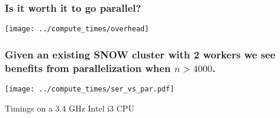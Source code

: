 \documentclass{beamer}
\begin{document}
\begin{frame}


\frametitle{Is it worth it to go parallel?}

    \centerline{\texttt{[image: ../compute\_times/overhead]}}




\end{frame}
\begin{frame}

\frametitle{Given an existing SNOW cluster with 2 workers we see benefits
    from parallelization when $n > 4000$.}

\centerline{\texttt{[image: ../compute\_times/ser\_vs\_par.pdf]}}

Timings on a 3.4 GHz Intel i3 CPU

\end{frame}
\end{document}
